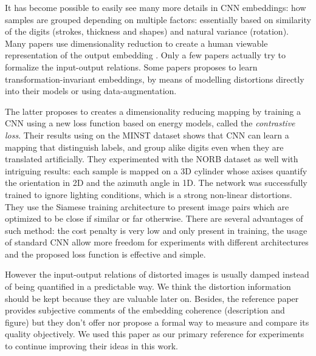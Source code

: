 \documentclass[a4paper,12pt]{report}
\begin{document}
It has become possible to easily see many more details in CNN embeddings: how samples are grouped depending on multiple factors: essentially based on similarity of the digits (strokes, thickness and shapes) and natural variance (rotation).
Many papers use dimensionality reduction to create a human viewable representation of the output embedding \cite{donahue2013decaf}\cite{yu2014visualizing}\cite{yaotiny}.
Only a few papers actually try to formalize the input-output relations\cite{goodfellow2009measuring}.
Some papers proposes to learn transformation-invariant embeddings, by means of modelling distortions directly into their models\cite{gens2014deep} or using data-augmentation\cite{hadsell2006dimensionality}.

The latter proposes to creates a dimensionality reducing mapping by training a CNN using a new loss function based on energy models, called the {\em contrastive loss}.
Their results using on the MINST dataset\cite{lecun1998mnist} shows that CNN can learn a mapping that distinguish labels, and group alike digits even when they are translated artificially.
They experimented with the NORB dataset\cite{lecun2004learning} as well with intriguing results: each sample is mapped on a 3D cylinder whose axises quantify the orientation in 2D and the azimuth angle in 1D.
The network was successfully trained to ignore lighting conditions, which is a strong non-linear distortions.
They use the Siamese training architecture to present image pairs which are optimized to be close if similar or far otherwise\cite{bromley1993signature}\cite{chopra2005learning}.
There are several advantages of such method: the cost penalty is very low and only present in training, the usage of standard CNN allow more freedom for experiments with different architectures and the proposed loss function is effective and simple.

However the input-output relations of distorted images is usually damped instead of being quantified in a predictable way.
We think the distortion information should be kept because they are valuable later on.
Besides, the reference paper provides subjective comments of the embedding coherence (description and figure) but they don't offer nor propose a formal way to measure and compare its quality objectively.
We used this paper as our primary reference for experiments to continue improving their ideas in this work.
\end{document}
